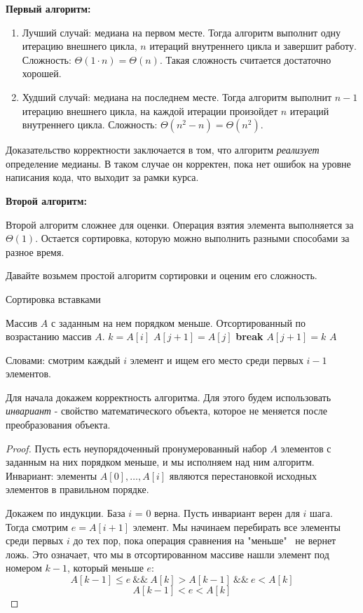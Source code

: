 \documentclass[../book.tex]{subfiles}
\begin{document}
	\textbf{Первый алгоритм:}
	\begin{enumerate}
		\item Лучший случай: медиана на первом месте. Тогда алгоритм выполнит одну итерацию внешнего цикла, $n$ итераций внутреннего цикла и завершит работу. Сложность: $\Theta(1 \cdot n) = \Theta(n)$. Такая сложность считается достаточно хорошей.
		\item Худший случай: медиана на последнем месте. Тогда алгоритм выполнит $n - 1$ итерацию внешнего цикла, на каждой итерации произойдет $n$ итераций внутреннего цикла. Сложность: $\Theta(n^2 - n) = \Theta(n^2)$. 
	\end{enumerate}
	
	Доказательство корректности заключается в том, что алгоритм \textit{реализует} определение медианы. В таком случае он корректен, пока нет ошибок на уровне написания кода, что выходит за рамки курса.
	
	\textbf{Второй алгоритм:}
	
	Второй алгоритм сложнее для оценки. Операция взятия элемента выполняется за $\Theta(1)$. Остается сортировка, которую можно выполнить разными способами за разное время. 
	
	Давайте возьмем простой алгоритм сортировки и оценим его сложность.
	
	\begin{algorithm}
		\caption{Сортировка вставками}
		\begin{algorithmic}[1]
			\Require Массив $A$ с заданным на нем порядком меньше.
			\Ensure Отсортированный по возрастанию массив $A$.
					\State $k = A[i]$
							\State $A[j+1] = A[j]$
						\Else
							\State \textbf{break}
						\EndIf
					\EndFor
					\State $A[j+1] = k$
				\EndFor
				\State \Return $A$
			\EndFunction
		\end{algorithmic}
	\end{algorithm}
	
	Словами: смотрим каждый $i$ элемент и ищем его место среди первых $i-1$ элементов.
	
	Для начала докажем корректность алгоритма. Для этого будем использовать \textit{инвариант} - свойство математического объекта, которое не меняется после преобразования объекта. 
	\begin{proof}
		Пусть есть неупорядоченный пронумерованный набор $A$ элементов с заданным на них порядком меньше, и мы исполняем над ним алгоритм. Инвариант: элементы $A[0], \ldots, A[i]$ являются перестановкой исходных элементов в правильном порядке.
		
		Докажем по индукции. База $i$ = 0 верна. Пусть инвариант верен для $i$ шага. Тогда смотрим $e = A[i+1]$ элемент. Мы начинаем перебирать все элементы среди первых $i$ до тех пор, пока операция сравнения на "меньше" \ не вернет ложь. Это означает, что мы в отсортированном массиве нашли элемент под номером $k - 1$, который меньше $e$:
		\[
		A[k-1] \leqslant e \ \&\& \ A[k] > A[k-1] \ \&\& \ e < A[k]
		\]
		\[
		A[k-1] < e < A[k]
		\]
	\end{proof}
	
\end{document}
